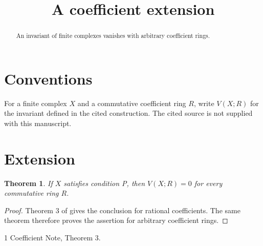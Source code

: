 \documentclass{article}
\title{A coefficient extension}
\newtheorem{theorem}{Theorem}
\begin{document}
\begin{abstract}
An invariant of finite complexes vanishes with arbitrary coefficient rings.
\end{abstract}
\section{Conventions}
For a finite complex $X$ and a commutative coefficient ring $R$, write
$V(X;R)$ for the invariant defined in the cited construction.
The cited source is not supplied with this manuscript.
\section{Extension}
\begin{theorem}\label{thm:extension}
If $X$ satisfies condition P, then $V(X;R)=0$ for every commutative ring $R$.
\end{theorem}
\begin{proof}
Theorem 3 of \cite{coefficient-note} gives the conclusion for rational
coefficients. The same theorem therefore proves the assertion for arbitrary
coefficient rings.
\end{proof}
\begin{thebibliography}{1}
 Coefficient Note, Theorem 3.
\end{thebibliography}
\end{document}
